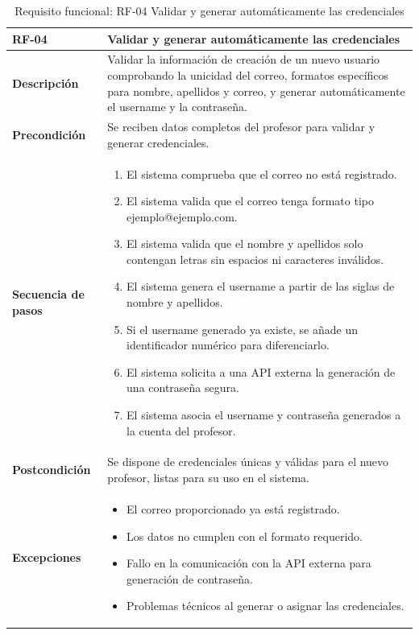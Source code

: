 \begin{table}[H]
\centering
\begin{tabularx}{\textwidth}{
  |>{\centering\arraybackslash}l
  |>{\centering\arraybackslash}X|}
\hline
\textbf{RF-04} & \textbf{Validar y generar automáticamente las credenciales} \\ \hline

\textbf{Descripción} & Validar la información de creación de un nuevo usuario comprobando la unicidad del correo, formatos específicos para nombre, apellidos y correo, y generar automáticamente el username y la contraseña. \\ \hline

\textbf{Precondición} & Se reciben datos completos del profesor para validar y generar credenciales. \\ \hline

\textbf{Secuencia de pasos} & 
\begin{enumerate}
  \item El sistema comprueba que el correo no está registrado.
  \item El sistema valida que el correo tenga formato tipo ejemplo@ejemplo.com.
  \item El sistema valida que el nombre y apellidos solo contengan letras sin espacios ni caracteres inválidos.
  \item El sistema genera el username a partir de las siglas de nombre y apellidos.
  \item Si el username generado ya existe, se añade un identificador numérico para diferenciarlo.
  \item El sistema solicita a una API externa la generación de una contraseña segura.
  \item El sistema asocia el username y contraseña generados a la cuenta del profesor.
\end{enumerate} \\ \hline

\textbf{Postcondición} & Se dispone de credenciales únicas y válidas para el nuevo profesor, listas para su uso en el sistema. \\ \hline

\textbf{Excepciones} & 
\begin{itemize}
  \item El correo proporcionado ya está registrado.
  \item Los datos no cumplen con el formato requerido.
  \item Fallo en la comunicación con la API externa para generación de contraseña.
  \item Problemas técnicos al generar o asignar las credenciales.
\end{itemize} \\ \hline
\end{tabularx}
\caption{Requisito funcional: RF-04 Validar y generar automáticamente las credenciales}
\end{table}
